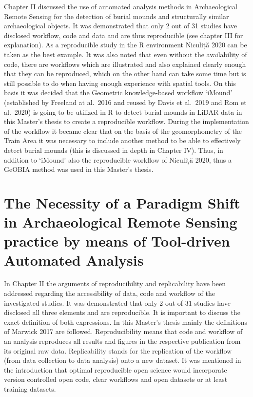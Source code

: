 \documentclass[
]{article}
\begin{document}
Chapter II discussed the use of automated analysis methods in Archaeological Remote Sensing for the detection of burial mounds and structurally similar archaeological objects. It was demonstrated that only 2 out of 31 studies have disclosed workflow, code and data and are thus reproducible (see chapter III for explanation). As a reproducible study in the R environment Niculiță 2020 can be taken as the best example. It was also noted that even without the availability of code, there are workflows which are illustrated and also explained clearly enough that they can be reproduced, which on the other hand can take some time but is still possible to do when having enough experience with spatial tools.
On this basis it was decided that the Geometric knowledge-based workflow `iMound' (established by Freeland at al.~2016 and reused by Davis et al.~2019 and Rom et al.~2020) is going to be utilized in R to detect burial mounds in LiDAR data in this Master's thesis to create a reproducible workflow. During the implementation of the workflow it became clear that on the basis of the geomorphometry of the Train Area it was necessary to include another method to be able to effectively detect burial mounds (this is discussed in depth in Chapter IV). Thus, in addition to `iMound' also the reproducible workflow of Niculiță 2020, thus a GeOBIA method was used in this Master's thesis.

\newpage

\hypertarget{the-necessity-of-a-paradigm-shift-in-archaeological-remote-sensing-practice-by-means-of-tool-driven-automated-analysis}{%
\section{The Necessity of a Paradigm Shift in Archaeological Remote Sensing practice by means of Tool-driven Automated Analysis}\label{the-necessity-of-a-paradigm-shift-in-archaeological-remote-sensing-practice-by-means-of-tool-driven-automated-analysis}}

In Chapter II the arguments of reproducibility and replicability have been addressed regarding the accessibility of data, code and workflow of the investigated studies. It was demonstrated that only 2 out of 31 studies have disclosed all three elements and are reproducible. It is important to discuss the exact definition of both expressions. In this Master's thesis mainly the definitions of Marwick 2017 are followed.
Reproducibility means that code and workflow of an analysis reproduces all results and figures in the respective publication from its original raw data. Replicability stands for the replication of the workflow (from data collection to data analysis) onto a new dataset. It was mentioned in the introduction that optimal reproducible open science would incorporate version controlled open code, clear workflows and open datasets or at least training datasets.
\end{document}
